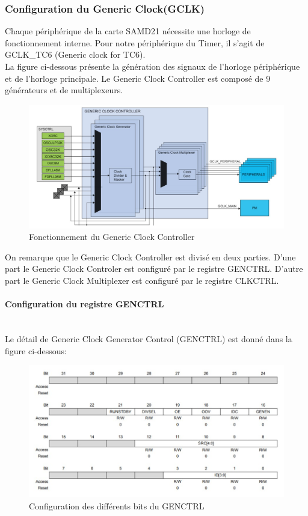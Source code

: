 \documentclass[a4paper]{article}
\begin{document}
	\subsubsection{Configuration du Generic Clock(GCLK)} 
	Chaque périphérique de la carte SAMD21 nécessite une horloge de fonctionnement interne. Pour notre périphérique du Timer, il s’agit de GCLK\_TC6 (Generic clock for TC6).\\
	La figure ci-dessous présente la génération des signaux de l'horloge périphérique et de l'horloge principale. Le Generic Clock Controller est composé de 9 générateurs et de multiplexeurs.\\
	\begin{figure}[H]
		\centering
		\includegraphics[width=12cm]{GENCLK_bloc.jpg}
		\caption{Fonctionnement du Generic Clock Controller}
	\end{figure}
	On remarque que le Generic Clock Controller est divisé en deux parties. D’une part le Generic Clock Controler est configuré par le registre GENCTRL. D'autre part le Generic Clock Multiplexer est configuré par le registre CLKCTRL.\\
	
	\paragraph{Configuration du registre GENCTRL} 
	~~\\
	Le détail de Generic Clock Generator Control (GENCTRL) est donné dans la figure ci-dessous:\\
	\begin{figure}[H]
		\centering
		\includegraphics[width=12cm]{GENCTRL.jpg}
		\caption{Configuration des différents bits du GENCTRL}
	\end{figure}
	
\end{document}
